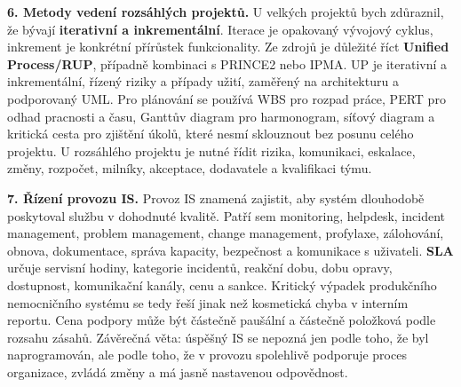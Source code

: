\begin{greenbox}
\textbf{6. Metody vedení rozsáhlých projektů.} U velkých projektů bych zdůraznil, že bývají \textbf{iterativní a inkrementální}. Iterace je opakovaný vývojový cyklus, inkrement je konkrétní přírůstek funkcionality. Ze zdrojů je důležité říct \textbf{Unified Process/RUP}, případně kombinaci s PRINCE2 nebo IPMA. UP je iterativní a inkrementální, řízený riziky a případy užití, zaměřený na architekturu a podporovaný UML. Pro plánování se používá WBS pro rozpad práce, PERT pro odhad pracnosti a času, Ganttův diagram pro harmonogram, síťový diagram a kritická cesta pro zjištění úkolů, které nesmí sklouznout bez posunu celého projektu. U rozsáhlého projektu je nutné řídit rizika, komunikaci, eskalace, změny, rozpočet, milníky, akceptace, dodavatele a kvalifikaci týmu.

\textbf{7. Řízení provozu IS.} Provoz IS znamená zajistit, aby systém dlouhodobě poskytoval službu v dohodnuté kvalitě. Patří sem monitoring, helpdesk, incident management, problem management, change management, profylaxe, zálohování, obnova, dokumentace, správa kapacity, bezpečnost a komunikace s uživateli. \textbf{SLA} určuje servisní hodiny, kategorie incidentů, reakční dobu, dobu opravy, dostupnost, komunikační kanály, cenu a sankce. Kritický výpadek produkčního nemocničního systému se tedy řeší jinak než kosmetická chyba v interním reportu. Cena podpory může být částečně paušální a částečně položková podle rozsahu zásahů. Závěrečná věta: úspěšný IS se nepozná jen podle toho, že byl naprogramován, ale podle toho, že v provozu spolehlivě podporuje proces organizace, zvládá změny a má jasně nastavenou odpovědnost.
\end{greenbox}

